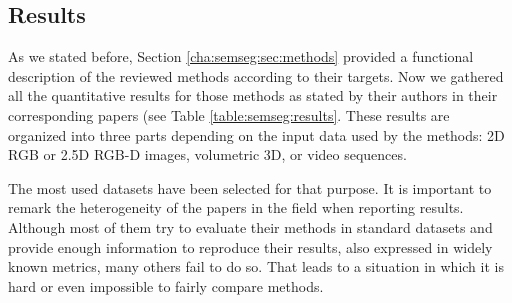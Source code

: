 \clearpage

\subsection{Results}

As we stated before, Section \ref{cha:semseg:sec:methods} provided a functional description of the reviewed methods according to their targets. Now we gathered all the quantitative results for those methods as stated by their authors in their corresponding papers (see Table \ref{table:semseg:results}. These results are organized into three parts depending on the input data used by the methods: \acs{2D} \acs{RGB} or \acs{2.5D} \acs{RGB-D} images, volumetric \acs{3D}, or video sequences.

The most used datasets have been selected for that purpose. It is important to remark the heterogeneity of the papers in the field when reporting results. Although most of them try to evaluate their methods in standard datasets and provide enough information to reproduce their results, also expressed in widely known metrics, many others fail to do so. That leads to a situation in which it is hard or even impossible to fairly compare methods.

